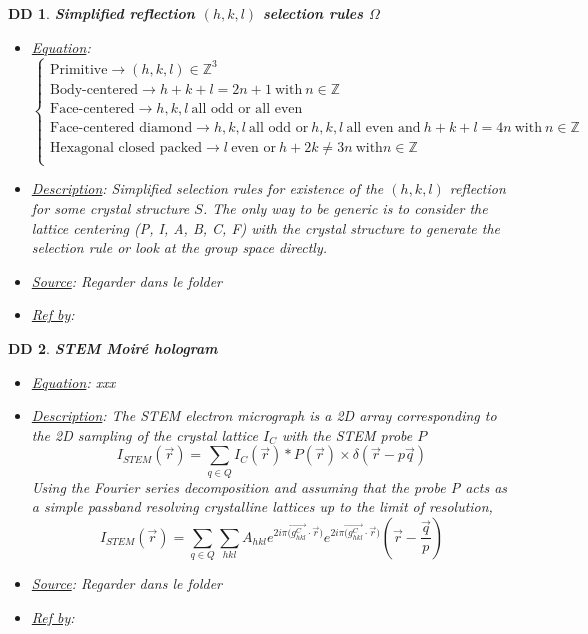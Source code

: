 \documentclass[12pt]{article}
\newtheorem{DD}{DD}
\begin{document}
\begin{DD}
\label{DD_4}
\noindent\colorbox{shadecolorDD}{\normalfont \textbf{Simplified reflection $(h,k,l)$ selection rules $\Omega$ }}
\normalfont
\begin{itemize}
\item \underline{Equation}:  $
\begin{cases}
\text{Primitive} \rightarrow (h,k,l) \in \mathbb{Z}^{3} \\
\text{Body-centered} \rightarrow h+k+l=2n+1 \ \text{with} \ n \in \mathbb{Z} \\
\text{Face-centered} \rightarrow h,k,l \  \text{all odd or all even} \\
\text{Face-centered diamond} \rightarrow h,k,l \ \text{all odd or} \  h,k,l \ \text{all even and} \ h+k+l=4n \ \text{with} \ n \in \mathbb{Z} \\
\text{Hexagonal closed packed} \rightarrow l  \ \text{even  or} \  h+2k\neq 3n \ \text{with} n \in \mathbb{Z}\\
\end{cases}$
\item \underline{Description}: Simplified selection rules for existence of the $(h,k,l)$ reflection for some crystal structure $S$. The only way to be generic is to consider the lattice centering (P, I, A, B, C, F) with the crystal structure to generate the selection rule or look at the group space directly.
\item \underline{Source}: Regarder dans le folder
\item \underline{Ref by}: 
\end{itemize}
\end{DD}

\begin{DD}
\label{DD_5}
\noindent\colorbox{shadecolorDD}{\normalfont \textbf{STEM Moir{\'e} hologram}}
\normalfont
\begin{itemize}
\item \underline{Equation}:  xxx
\item \underline{Description}: The STEM electron micrograph is a 2D array corresponding to the 2D sampling of the crystal lattice $I_{C}$ with the STEM probe $P$
\begin{equation}
I_{STEM}(\vec{r}) = \sum_{q\in 
Q} I_C(\vec{r}) \ast P(\vec{r}) \times \delta(\vec{r}-p\vec{q}) 
\end{equation}
Using the Fourier series decomposition and assuming that the probe P acts as a simple passband resolving crystalline lattices up to the limit of resolution,
\begin{equation}
I_{STEM}(\vec{r}) = \sum_{q\in 
Q}\sum_{hkl} A_{hkl}e^{2i\pi \overrightarrow{(g_{hkl}^{C}} \cdot \overrightarrow{r})} e^{2i\pi \overrightarrow{(g_{hkl}^{C}} \cdot \overrightarrow{r})}(\vec{r}-\frac{\vec{q}}{p}) 
\end{equation}
\item \underline{Source}: Regarder dans le folder
\item \underline{Ref by}: 
\end{itemize}
\end{DD}
\end{document}
